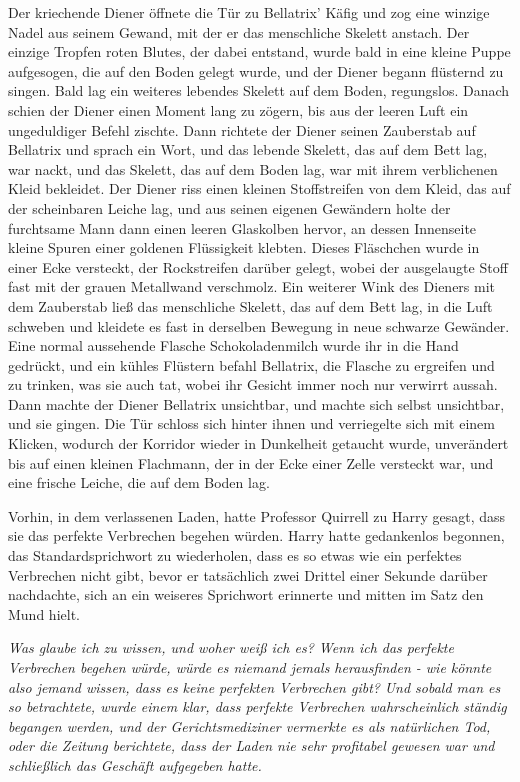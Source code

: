 Der kriechende Diener öffnete die Tür zu Bellatrix' Käfig und zog eine winzige
Nadel aus seinem Gewand, mit der er das menschliche Skelett anstach. Der einzige
Tropfen roten Blutes, der dabei entstand, wurde bald in eine kleine Puppe
aufgesogen, die auf den Boden gelegt wurde, und der Diener begann flüsternd zu
singen. Bald lag ein weiteres lebendes Skelett auf dem Boden, regungslos. Danach
schien der Diener einen Moment lang zu zögern, bis aus der leeren Luft ein
ungeduldiger Befehl zischte. Dann richtete der Diener seinen Zauberstab auf
Bellatrix und sprach ein Wort, und das lebende Skelett, das auf dem Bett lag,
war nackt, und das Skelett, das auf dem Boden lag, war mit ihrem verblichenen
Kleid bekleidet. Der Diener riss einen kleinen Stoffstreifen von dem Kleid, das
auf der scheinbaren Leiche lag, und aus seinen eigenen Gewändern holte der
furchtsame Mann dann einen leeren Glaskolben hervor, an dessen Innenseite kleine
Spuren einer goldenen Flüssigkeit klebten. Dieses Fläschchen wurde in einer Ecke
versteckt, der Rockstreifen darüber gelegt, wobei der ausgelaugte Stoff fast mit
der grauen Metallwand verschmolz. Ein weiterer Wink des Dieners mit dem
Zauberstab ließ das menschliche Skelett, das auf dem Bett lag, in die Luft
schweben und kleidete es fast in derselben Bewegung in neue schwarze Gewänder.
Eine normal aussehende Flasche Schokoladenmilch wurde ihr in die Hand gedrückt,
und ein kühles Flüstern befahl Bellatrix, die Flasche zu ergreifen und zu
trinken, was sie auch tat, wobei ihr Gesicht immer noch nur verwirrt aussah.
Dann machte der Diener Bellatrix unsichtbar, und machte sich selbst unsichtbar,
und sie gingen. Die Tür schloss sich hinter ihnen und verriegelte sich mit einem
Klicken, wodurch der Korridor wieder in Dunkelheit getaucht wurde, unverändert
bis auf einen kleinen Flachmann, der in der Ecke einer Zelle versteckt war, und
eine frische Leiche, die auf dem Boden lag.

Vorhin, in dem verlassenen Laden, hatte Professor Quirrell zu Harry gesagt, dass
sie das perfekte Verbrechen begehen würden. Harry hatte gedankenlos begonnen,
das Standardsprichwort zu wiederholen, dass es so etwas wie ein perfektes
Verbrechen nicht gibt, bevor er tatsächlich zwei Drittel einer Sekunde darüber
nachdachte, sich an ein weiseres Sprichwort erinnerte und mitten im Satz den
Mund hielt.

\emph{Was glaube ich zu wissen, und woher weiß ich es? Wenn ich das perfekte Verbrechen begehen würde, würde es niemand jemals herausfinden - wie könnte also jemand wissen, dass es keine perfekten Verbrechen gibt? }
\emph{Und sobald man es so betrachtete, wurde einem klar, dass perfekte Verbrechen wahrscheinlich ständig begangen werden, und der Gerichtsmediziner vermerkte es als natürlichen Tod, oder die Zeitung berichtete, dass der Laden nie sehr profitabel gewesen war und schließlich das Geschäft aufgegeben hatte. }

